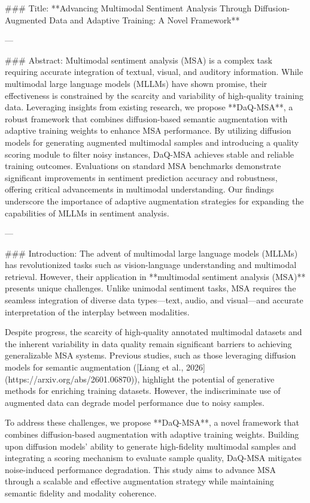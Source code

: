 ### Title:
**Advancing Multimodal Sentiment Analysis Through Diffusion-Augmented Data and Adaptive Training: A Novel Framework**

---

### Abstract:
Multimodal sentiment analysis (MSA) is a complex task requiring accurate integration of textual, visual, and auditory information. While multimodal large language models (MLLMs) have shown promise, their effectiveness is constrained by the scarcity and variability of high-quality training data. Leveraging insights from existing research, we propose **DaQ-MSA**, a robust framework that combines diffusion-based semantic augmentation with adaptive training weights to enhance MSA performance. By utilizing diffusion models for generating augmented multimodal samples and introducing a quality scoring module to filter noisy instances, DaQ-MSA achieves stable and reliable training outcomes. Evaluations on standard MSA benchmarks demonstrate significant improvements in sentiment prediction accuracy and robustness, offering critical advancements in multimodal understanding. Our findings underscore the importance of adaptive augmentation strategies for expanding the capabilities of MLLMs in sentiment analysis.

---

### Introduction:
The advent of multimodal large language models (MLLMs) has revolutionized tasks such as vision-language understanding and multimodal retrieval. However, their application in **multimodal sentiment analysis (MSA)** presents unique challenges. Unlike unimodal sentiment tasks, MSA requires the seamless integration of diverse data types—text, audio, and visual—and accurate interpretation of the interplay between modalities.

Despite progress, the scarcity of high-quality annotated multimodal datasets and the inherent variability in data quality remain significant barriers to achieving generalizable MSA systems. Previous studies, such as those leveraging diffusion models for semantic augmentation ([Liang et al., 2026](https://arxiv.org/abs/2601.06870)), highlight the potential of generative methods for enriching training datasets. However, the indiscriminate use of augmented data can degrade model performance due to noisy samples.

To address these challenges, we propose **DaQ-MSA**, a novel framework that combines diffusion-based augmentation with adaptive training weights. Building upon diffusion models’ ability to generate high-fidelity multimodal samples and integrating a scoring mechanism to evaluate sample quality, DaQ-MSA mitigates noise-induced performance degradation. This study aims to advance MSA through a scalable and effective augmentation strategy while maintaining semantic fidelity and modality coherence.

